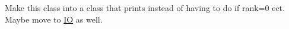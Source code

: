 
\begin{DoxyRefList}
\item[Class \mbox{\hyperlink{class_sys_print}{Sys\+Print}} ]\label{todo__todo000001}%
%
Make this class into a class that prints instead of having to do if rank=0 ect. Maybe move to \mbox{\hyperlink{namespace_i_o}{IO}} as well.
\end{DoxyRefList}